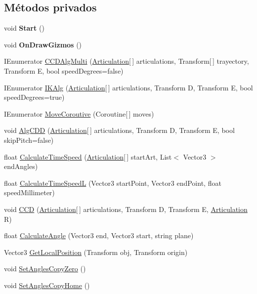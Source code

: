 \subsection*{Métodos privados}
\begin{DoxyCompactItemize}
\item 
\mbox{\label{class_i_k_a05da0dc2c3eceb11d7ba35f85fddcc96}} 
void {\bfseries Start} ()
\item 
\mbox{\label{class_i_k_afeaf9f9885b691b88c424c0b67d18608}} 
void {\bfseries On\+Draw\+Gizmos} ()
\item 
I\+Enumerator \mbox{\hyperlink{class_i_k_a013718309a8051f89d0865803f2d54e6}{C\+C\+D\+Alg\+Multi}} (\mbox{\hyperlink{class_articulation}{Articulation}}\mbox{[}$\,$\mbox{]} articulations, Transform\mbox{[}$\,$\mbox{]} trayectory, Transform E, bool speed\+Degrees=false)
\item 
I\+Enumerator \mbox{\hyperlink{class_i_k_ad35cf24eca8cdf6e91e9b7d0c7c4337a}{I\+K\+Alg}} (\mbox{\hyperlink{class_articulation}{Articulation}}\mbox{[}$\,$\mbox{]} articulations, Transform D, Transform E, bool speed\+Degrees=true)
\item 
I\+Enumerator \mbox{\hyperlink{class_i_k_afc0847eff1049646f1c299debeccde27}{Move\+Coroutive}} (Coroutine\mbox{[}$\,$\mbox{]} moves)
\item 
void \mbox{\hyperlink{class_i_k_a40cdb9bf2fd32e436a1a6f012915f9d8}{Alg\+C\+DD}} (\mbox{\hyperlink{class_articulation}{Articulation}}\mbox{[}$\,$\mbox{]} articulations, Transform D, Transform E, bool skip\+Pitch=false)
\item 
float \mbox{\hyperlink{class_i_k_ad01a8072ea1add2840e26847b21bb7ff}{Calculate\+Time\+Speed}} (\mbox{\hyperlink{class_articulation}{Articulation}}\mbox{[}$\,$\mbox{]} start\+Art, List$<$ Vector3 $>$ end\+Angles)
\item 
float \mbox{\hyperlink{class_i_k_ab99eedabf9fd4e61a273142356272e0f}{Calculate\+Time\+SpeedL}} (Vector3 start\+Point, Vector3 end\+Point, float speed\+Millimeter)
\item 
void \mbox{\hyperlink{class_i_k_a636e3f7944553bdc2b420d5906d719e6}{C\+CD}} (\mbox{\hyperlink{class_articulation}{Articulation}}\mbox{[}$\,$\mbox{]} articulations, Transform D, Transform E, \mbox{\hyperlink{class_articulation}{Articulation}} R)
\item 
float \mbox{\hyperlink{class_i_k_a807e9ada54f7e21856b11ec1f288970e}{Calculate\+Angle}} (Vector3 end, Vector3 start, string plane)
\item 
Vector3 \mbox{\hyperlink{class_i_k_a39c773afffbbc08a778a6a6ded4ebe9f}{Get\+Local\+Position}} (Transform obj, Transform origin)
\item 
void \mbox{\hyperlink{class_i_k_a8b4370a0f1ee8b6b558c1f0b66997e01}{Set\+Angles\+Copy\+Zero}} ()
\item 
void \mbox{\hyperlink{class_i_k_a37830992ab0d16482aa1cd55f7f0fa38}{Set\+Angles\+Copy\+Home}} ()
\end{DoxyCompactItemize}
